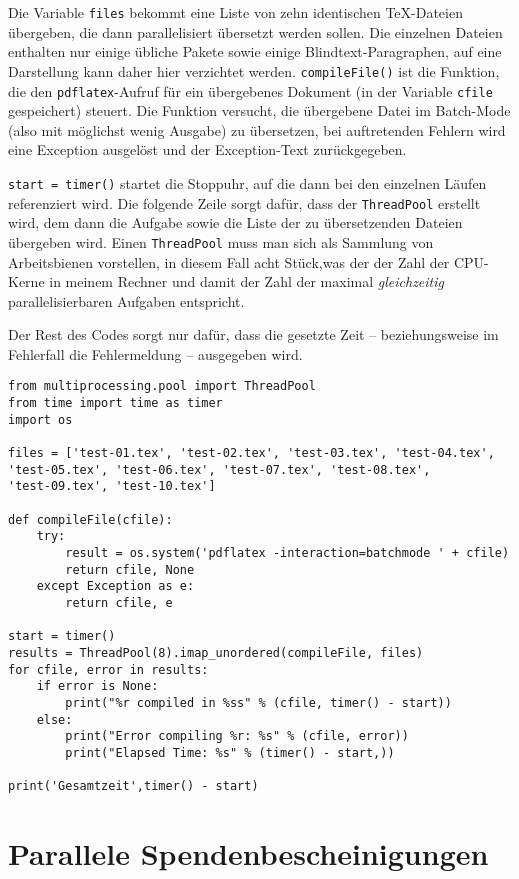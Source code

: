 \documentclass{dtk}
\begin{document}
Die Variable \texttt{files} bekommt eine Liste von zehn identischen \TeX-Dateien übergeben, die dann parallelisiert übersetzt werden sollen. Die einzelnen Dateien enthalten nur einige übliche Pakete sowie einige Blindtext-Paragraphen, auf eine Darstellung kann daher hier verzichtet werden.  \texttt{compileFile()} ist die Funktion, die den \texttt{pdflatex}-Aufruf für ein übergebenes Dokument (in der Variable \texttt{cfile} gespeichert) steuert. Die Funktion versucht, die übergebene Datei im Batch-Mode (also mit möglichst wenig Ausgabe) zu übersetzen, bei auftretenden Fehlern wird eine Exception ausgelöst und der Exception-Text zurückgegeben. 

\texttt{start = timer()} startet die Stoppuhr, auf die dann bei den einzelnen Läufen referenziert wird. Die folgende Zeile sorgt dafür, dass der \texttt{ThreadPool} erstellt wird, dem dann die Aufgabe sowie die Liste der zu übersetzenden Dateien übergeben wird. Einen \texttt{ThreadPool} muss man sich als Sammlung von Arbeitsbienen vorstellen, in diesem Fall acht Stück,was der der Zahl der CPU-Kerne in meinem Rechner und damit der Zahl der maximal \textit{gleichzeitig} parallelisierbaren Aufgaben entspricht.

Der Rest des Codes sorgt nur dafür, dass die gesetzte Zeit -- beziehungsweise im Fehlerfall die Fehlermeldung -- ausgegeben wird.

\begin{lstlisting}[caption={Quellcode für den ersten Test},label={lis:min}]
from multiprocessing.pool import ThreadPool
from time import time as timer
import os
 
files = ['test-01.tex', 'test-02.tex', 'test-03.tex', 'test-04.tex',
'test-05.tex', 'test-06.tex', 'test-07.tex', 'test-08.tex', 
'test-09.tex', 'test-10.tex']
 
def compileFile(cfile):
	try:
		result = os.system('pdflatex -interaction=batchmode ' + cfile)
		return cfile, None
	except Exception as e:
		return cfile, e	
 
start = timer()
results = ThreadPool(8).imap_unordered(compileFile, files)
for cfile, error in results:
	if error is None:
		print("%r compiled in %ss" % (cfile, timer() - start))
	else:
		print("Error compiling %r: %s" % (cfile, error))
		print("Elapsed Time: %s" % (timer() - start,))

print('Gesamtzeit',timer() - start)
\end{lstlisting}

\section{Parallele Spendenbescheinigungen}
\end{document}
